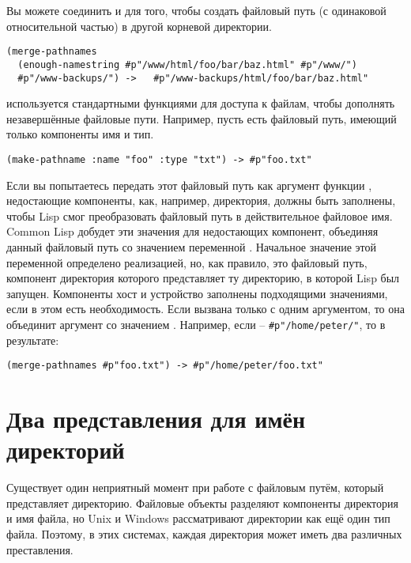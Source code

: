 Вы можете соединить  и  для того, чтобы
создать файловый путь (с одинаковой относительной частью) в другой корневой директории.

\begin{lstlisting}
(merge-pathnames 
  (enough-namestring #p"/www/html/foo/bar/baz.html" #p"/www/") 
  #p"/www-backups/") ->   #p"/www-backups/html/foo/bar/baz.html" 
\end{lstlisting}

 используется стандартными функциями для доступа к файлам, чтобы
дополнять незавершённые файловые пути. Например, пусть есть файловый путь, имеющий только
компоненты имя и тип.

\begin{lstlisting}
(make-pathname :name "foo" :type "txt") -> #p"foo.txt" 
\end{lstlisting}

Если вы попытаетесь передать этот файловый путь как аргумент функции ,
недостающие компоненты, как, например, директория, должны быть заполнены, чтобы Lisp смог
преобразовать файловый путь в действительное файловое имя. Common Lisp добудет эти
значения для недостающих компонент, объединяя данный файловый путь со значением переменной
. Начальное значение этой переменной определено
реализацией, но, как правило, это файловый путь, компонент директория которого
представляет ту директорию, в которой Lisp был запущен. Компоненты хост и устройство
заполнены подходящими значениями, если в этом есть необходимость. Если
 вызвана только с одним аргументом, то она объединит аргумент со
значением . Например, если
 -- \lstinline!#p"/home/peter/"!, то в результате:

\begin{lstlisting}
(merge-pathnames #p"foo.txt") -> #p"/home/peter/foo.txt" 
\end{lstlisting}

\section{Два представления для имён директорий}

Существует один неприятный момент при работе с файловым путём, который представляет
директорию. Файловые объекты разделяют компоненты директория и имя файла, но Unix и
Windows рассматривают директории как ещё один тип файла. Поэтому, в этих системах, каждая
директория может иметь два различных преставления.

